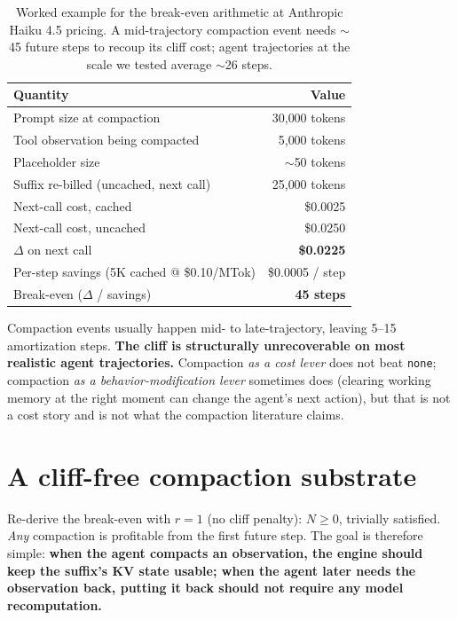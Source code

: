 \documentclass[letterpaper,twocolumn,10pt]{article}
\begin{document}
\begin{table}[h]
\centering\small
\setlength{\tabcolsep}{4pt}
\begin{tabular}{lr}
\toprule
\textbf{Quantity} & \textbf{Value} \\
\midrule
Prompt size at compaction         & 30{,}000 tokens \\
Tool observation being compacted  & 5{,}000 tokens \\
Placeholder size                  & $\sim$50 tokens \\
Suffix re-billed (uncached, next call) & 25{,}000 tokens \\
\midrule
Next-call cost, cached            & \$0.0025 \\
Next-call cost, uncached          & \$0.0250 \\
$\Delta$ on next call             & \textbf{\$0.0225} \\
\midrule
Per-step savings (5K cached @ \$0.10/MTok) & \$0.0005 / step \\
Break-even ($\Delta$ / savings)   & \textbf{45 steps} \\
\bottomrule
\end{tabular}
\caption{Worked example for the break-even arithmetic at
Anthropic Haiku 4.5 pricing. A mid-trajectory compaction event
needs $\sim$45 future steps to recoup its cliff cost; agent
trajectories at the scale we tested average $\sim$26 steps.}
\label{tab:cliff_amp}
\end{table}
Compaction events usually happen mid- to late-trajectory, leaving
5--15 amortization steps. \textbf{The cliff is structurally
unrecoverable on most realistic agent trajectories.} Compaction
\emph{as a cost lever} does not beat \texttt{none}; compaction
\emph{as a behavior-modification lever} sometimes does (clearing
working memory at the right moment can change the agent's next
action), but that is not a cost story and is not what the
compaction literature claims.

\section{A cliff-free compaction substrate}
\label{sec:keep_bytes}

Re-derive the break-even with $r = 1$ (no cliff penalty):
$N \geq 0$, trivially satisfied. \emph{Any} compaction is
profitable from the first future step. The goal is therefore
simple: \textbf{when the agent compacts an observation, the
engine should keep the suffix's KV state usable; when the agent
later needs the observation back, putting it back should not
require any model recomputation.}
\end{document}
